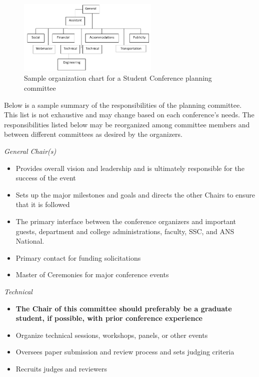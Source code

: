 \documentclass[12pt]{article}
\begin{document}
\begin{figure}[b]
    \centering
    \includegraphics[width=0.6\textwidth]{OrgChart.PNG}
    \caption{Sample organization chart for a Student Conference planning committee}
    \label{fig:OrgChart}
\end{figure}

Below is a sample summary of the responsibilities of the planning committee.
This list is not exhaustive and may change based on each conference's needs.
The responsibilities listed below may be reorganized among committee members and between different committees as desired by the organizers.

\emph{General Chair(s)}
\begin{itemize}
    \item Provides overall vision and leadership and is ultimately responsible for the success of the event
    \item Sets up the major milestones and goals and directs the other Chairs to ensure that it is followed
    \item The primary interface between the conference organizers and important guests, department and college administrations, faculty, SSC, and ANS National.
    \item Primary contact for funding solicitations
    \item Master of Ceremonies for major conference events
\end{itemize}

\emph{Technical}
\begin{itemize}
    \item \textbf{The Chair of this committee should preferably be a graduate student, if possible, with prior conference experience}
    \item Organize technical sessions, workshops, panels, or other events 
    \item Oversees paper submission and review process and sets judging criteria
    \item Recruits judges and reviewers
\end{itemize}
\end{document}
